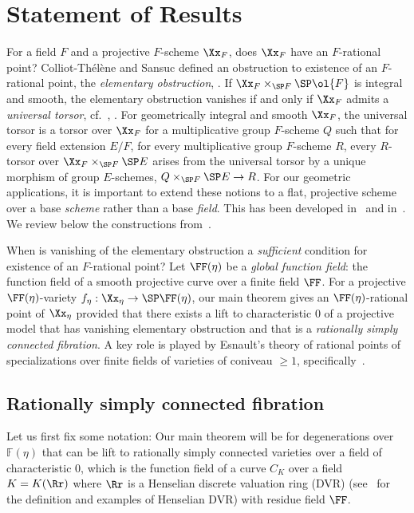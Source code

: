 \section{Statement of Results}\label{sec-state}

For a field $F$ and a projective $F$-scheme $\Xx_F$, does $\Xx_F$ have an $F$-rational point? Colliot-Thélène and Sansuc defined an obstruction to existence of an $F$-rational point, the
\emph{elementary obstruction}, \cite[Section~2.2]{CTSansuc}. If $\Xx_F\times_{\SP F} \SP \ol{F}$ is integral and smooth, the elementary obstruction vanishes if and only if $\Xx_F$ admits a \emph{universal torsor}, cf.~\cite[Proposition~2.2.3]{CTSansuc}, \cite[Theorem~2.3.4]{Sk}. For geometrically integral and smooth $\Xx_F$, the universal torsor is a torsor over $\Xx_F$ for a multiplicative group $F$-scheme $Q$ such that for every field extension $E/F$, for every multiplicative group $F$-scheme $R$, every $R$-torsor over $\Xx_F\times_{\SP F} \SP E$ arises from the universal torsor by a unique morphism of group $E$-schemes, $Q\times_{\SP F} \SP E \to R$. For our geometric applications, it is important to extend these notions to a flat, projective scheme over a base \emph{scheme} rather than a base \emph{field}. This has been developed in~\cite[Definition, p.~468]{Pirutka} and in~\cite{Zhu}. We review below the constructions from~\cite{Zhu}.

When is vanishing of the elementary obstruction a \emph{sufficient} condition for existence of an $F$-rational point? Let $\FF(\eta)$ be a \emph{global function field}: the function field of a smooth projective curve over a finite field $\FF$. For a projective $\FF(\eta)$-variety $f_\eta:\Xx_\eta \to \SP \FF(\eta)$, our main theorem gives an $\FF(\eta)$-rational point of $\Xx_\eta$ provided that there exists a lift to characteristic $0$ of a projective model that has vanishing elementary obstruction and that is a \emph{rationally simply connected fibration}. A key role is played by Esnault's theory of rational points of specializations over finite fields of varieties of coniveau $\geq 1$, specifically~\cite[Corollary~1.2]{Esnaultpadic}.


\subsection{Rationally simply connected fibration}

Let us first fix some notation: Our main theorem will be for degenerations over $\mathbb{F}(\eta)$ that can be lift to rationally simply connected varieties over a field of characteristic 0, which is the function field of a curve $C_K$ over a field $K=K(\Rr)$ where $\Rr$ is a Henselian discrete valuation ring (DVR) (see~\cite{Greenberg84} for the definition and examples of Henselian DVR) with residue field $\FF$.



